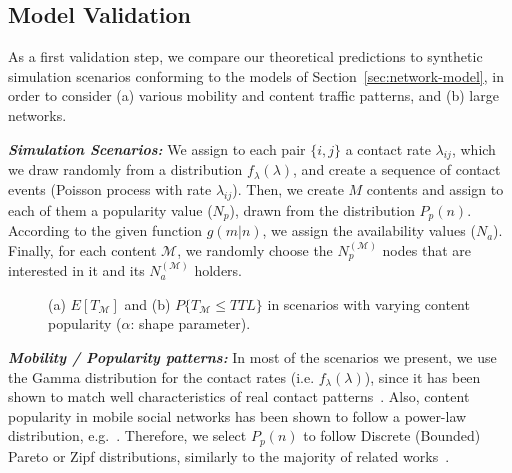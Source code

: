 \documentclass[journal]{IEEEtran}
\newcommand{\Np}{N_{p}^{(\mathcal{M})}}
\newcommand{\Na}{N_{a}^{(\mathcal{M})}}
\begin{document}
\subsection{Model Validation}\label{sec:synthetic-simulations}

As a first validation step, we compare our theoretical predictions to synthetic simulation scenarios conforming to the models of Section~\ref{sec:network-model}, in order to consider (a) various mobility and content traffic patterns, and (b) large networks. 

\textit{\textbf{Simulation Scenarios:}} We assign to each pair $\{i,j\}$ a contact rate $\lambda_{ij}$, which we draw randomly from a distribution $f_{\lambda}(\lambda)$, and create a sequence of contact events (Poisson process with rate $\lambda_{ij}$). Then, we create $M$ contents and assign to each of them a popularity value ($N_{p}$), drawn from the distribution $P_{p}(n)$. According to the given function $g(m|n)$, we assign the availability values ($N_{a}$). Finally, for each content $\mathcal{M}$, we randomly choose the $\Np$ nodes that are interested in it and its $\Na$ holders. 

\begin{figure}
\centering
{}
\caption{(a) $E[T_{\mathcal{M}}]$ and (b) $P\{T_{\mathcal{M}}\leq TTL\}$ in scenarios with varying content popularity ($\alpha$: shape parameter).}
\label{fig:synth-gLinear}
\end{figure}


\textit{\textbf{Mobility / Popularity patterns:}} In most of the scenarios we present, we use the Gamma distribution for the contact rates (i.e. $f_{\lambda}(\lambda)$), since it has been shown to match well characteristics of real contact patterns~\cite{Passarella-aggregateIT}. Also, content popularity in mobile social networks has been shown to follow a power-law distribution, e.g.~\cite{youtube-traffic-from-edge, RSS-traffic-characteristics, pavlos-dataset-AOC}. Therefore, we select $P_{p}(n)$ to follow Discrete (Bounded) Pareto or Zipf distributions, similarly to the majority of related works~\cite{Gao-user-centric-DTN,multiple-offloading,CEDO}.
\end{document}

